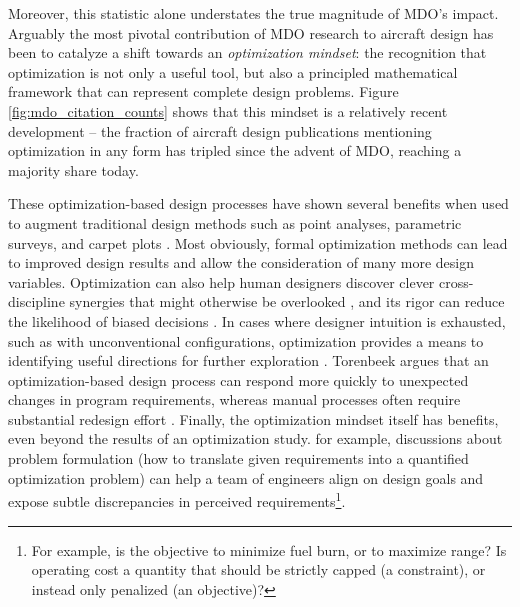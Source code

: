 \documentclass[12pt,vi,oneside,table]{report}
\begin{document}
    Moreover, this statistic alone understates the true magnitude of MDO's impact. Arguably the most pivotal contribution of MDO research to aircraft design has been to catalyze a shift towards an \textit{optimization mindset}: the recognition that optimization is not only a useful tool, but also a principled mathematical framework that can represent complete design problems. Figure \ref{fig:mdo_citation_counts} shows that this mindset is a relatively recent development -- the fraction of aircraft design publications mentioning optimization in any form has tripled since the advent of MDO, reaching a majority share today.

    These optimization-based design processes have shown several benefits when used to augment traditional design methods such as point analyses, parametric surveys, and carpet plots \cite{torenbeek_advanced_2013}. Most obviously, formal optimization methods can lead to improved design results and allow the consideration of many more design variables. Optimization can also help human designers discover clever cross-discipline synergies that might otherwise be overlooked \cite{drela_pros_1998}, and its rigor can reduce the likelihood of biased decisions \cite{torenbeek_advanced_2013}. In cases where designer intuition is exhausted, such as with unconventional configurations, optimization provides a means to identifying useful directions for further exploration \cite{drela_pros_1998}. Torenbeek argues that an optimization-based design process can respond more quickly to unexpected changes in program requirements, whereas manual processes often require substantial redesign effort \cite{torenbeek_advanced_2013}. Finally, the optimization mindset itself has benefits, even beyond the results of an optimization study. for example, discussions about problem formulation (how to translate given requirements into a quantified optimization problem) can help a team of engineers align on design goals and expose subtle discrepancies in perceived requirements\footnote{For example, is the objective to minimize fuel burn, or to maximize range? Is operating cost a quantity that should be strictly capped (a constraint), or instead only penalized (an objective)?}.
\end{document}

